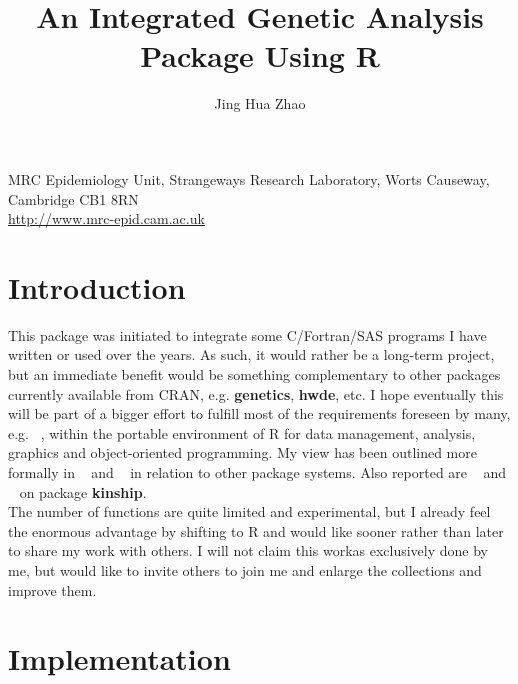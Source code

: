 \documentclass[11pt,a4paper]{article}
\begin{document}
\title{An Integrated Genetic Analysis Package Using R}
\author{Jing Hua Zhao}
\date{}
\maketitle

\begin{center}
MRC Epidemiology Unit, Strangeways Research Laboratory, Worts Causeway, Cambridge CB1 8RN\\
\url{http://www.mrc-epid.cam.ac.uk}
\end{center}

\tableofcontents



\section{Introduction}

This package was initiated to integrate some C/Fortran/SAS programs I have written 
or used over the years. As such, it would rather be a long-term project, but an
immediate benefit would be something complementary to other packages currently
available from CRAN, e.g. {\bf genetics}, {\bf hwde}, etc. I hope eventually this will
be part of a bigger effort to fulfill most of the requirements foreseen by many, 
e.g. ~\cite{guo00}, within the portable environment of R for data management, 
analysis, graphics and object-oriented programming. My view has been outlined
more formally in ~\cite{zt06a} and ~\cite{zt06b} in relation to other package
systems. Also reported are ~\cite{zhao05} and ~\cite{zhao06} on package {\bf  kinship}.\\

The number of functions are quite limited and experimental, but I already feel
the enormous advantage by shifting to R and would like sooner rather than later
to share my work with others. I will not claim this workas exclusively done by
me, but would like to invite others to join me and enlarge the collections and
improve them.

\section{Implementation}
\end{document}
